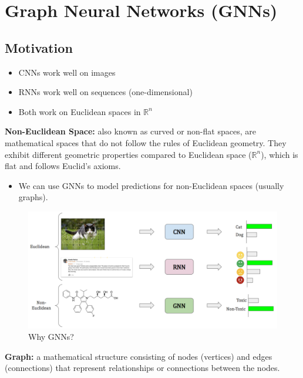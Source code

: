 
\chapter{Graph Neural Networks (GNNs)}

\section{Motivation}
\begin{itemize}
    \item CNNs work well on images
    \item RNNs work well on sequences (one-dimensional)
    \item Both work on Euclidean spaces in $\mathbb{R}^n$
\end{itemize}

\begin{definition}
    \textbf{Non-Euclidean Space:} also known as curved or non-flat spaces, are mathematical spaces that do not follow the rules of Euclidean geometry. They exhibit different geometric properties compared to Euclidean space ($\mathbb{R}^n$), which is flat and follows Euclid's axioms.
\end{definition}

\begin{itemize}
    \item We can use GNNs to model predictions for non-Euclidean spaces (usually graphs).
\end{itemize}

\begin{figure}[h!t]
    \centering
    \includegraphics[width=1\linewidth]{gnnsmotivation.png}
    \caption{Why GNNs?}
    \label{fig:enter-label}
\end{figure}

\begin{definition}
    \textbf{Graph:} a mathematical structure consisting of nodes (vertices) and edges (connections) that represent relationships or connections between the nodes.
\end{definition}

